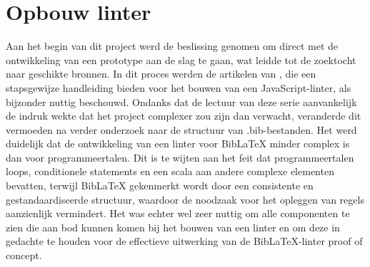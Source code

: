\section{Opbouw linter}
Aan het begin van dit project werd de beslissing genomen om direct met de ontwikkeling van een prototype aan de slag te gaan, wat leidde tot de zoektocht naar geschikte bronnen. In dit proces werden de artikelen van \textcite{BorgesLate2021}, die een stapsgewijze handleiding bieden voor het bouwen van een JavaScript-linter, als bijzonder nuttig beschouwd. Ondanks dat de lectuur van deze serie aanvankelijk de indruk wekte dat het project complexer zou zijn dan verwacht, veranderde dit vermoeden na verder onderzoek naar de structuur van .bib-bestanden. Het werd duidelijk dat de ontwikkeling van een linter voor BibLaTeX minder complex is dan voor programmeertalen. Dit is te wijten aan het feit dat programmeertalen loops, conditionele statements en een scala aan andere complexe elementen bevatten, terwijl BibLaTeX gekenmerkt wordt door een consistente en gestandaardiseerde structuur, waardoor de noodzaak voor het opleggen van regels aanzienlijk vermindert. Het was echter wel zeer nuttig om alle componenten te zien die aan bod kunnen komen bij het bouwen van een linter en om deze in gedachte te houden voor de effectieve uitwerking van de BibLaTeX-linter proof of concept.